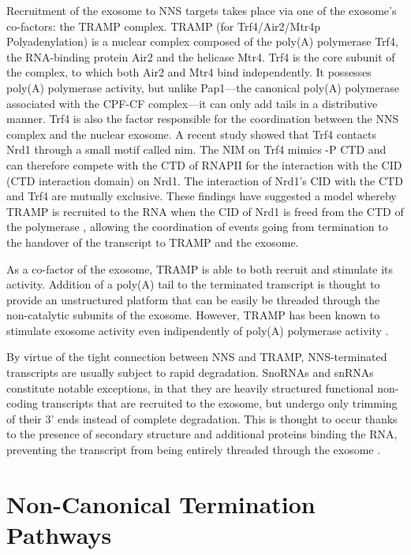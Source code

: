 Recruitment of the exosome to NNS targets takes place via one of the exosome’s co-factors: the TRAMP complex. 
TRAMP (for Trf4/Air2/Mtr4p Polyadenylation) is a nuclear complex composed of the poly(A) polymerase Trf4, the RNA-binding protein Air2 and the helicase Mtr4. 
Trf4 is the core subunit of the complex, to which both Air2 and Mtr4 bind independently. 
It possesses poly(A) polymerase activity, but unlike Pap1---the canonical poly(A) polymerase associated with the CPF-CF complex---it can only add tails in a distributive manner. 
Trf4 is also the factor responsible for the coordination between the NNS complex and the nuclear exosome. 
A recent study showed that Trf4 contacts Nrd1 through a small motif called \gls{nim}. 
The NIM on Trf4 mimics \serf{}-P CTD and can therefore compete with the CTD of RNAPII for the interaction with the CID (CTD interaction domain) on Nrd1. 
The interaction of Nrd1’s CID with the CTD and Trf4 are mutually exclusive. 
These findings have suggested a model whereby TRAMP is recruited to the RNA when the CID of Nrd1 is freed from the CTD of the polymerase \cite{tudek:2014:molecular}, allowing the coordination of events going from termination to the handover of the transcript to TRAMP and the exosome.

As a co-factor of the exosome, TRAMP is able to both recruit and stimulate its activity. 
Addition of a poly(A) tail to the terminated transcript is thought to provide an unstructured platform that can be easily be threaded through the non-catalytic subunits of the exosome. 
However, TRAMP has been known to stimulate exosome activity even indipendently of poly(A) polymerase activity \cite{tudek:2014:molecular}. 

By virtue of the tight connection between NNS and TRAMP, NNS-terminated transcripts are usually subject to rapid degradation. SnoRNAs and snRNAs constitute notable exceptions, in that they are heavily structured functional non-coding transcripts that are recruited to the exosome, but undergo only trimming of their 3’ ends instead of complete degradation. This is thought to occur thanks to the presence of secondary structure and additional proteins binding the RNA, preventing the transcript from being entirely threaded through the exosome \cite{mitchell:1997:exosome}.


\section{Non-Canonical Termination Pathways}

